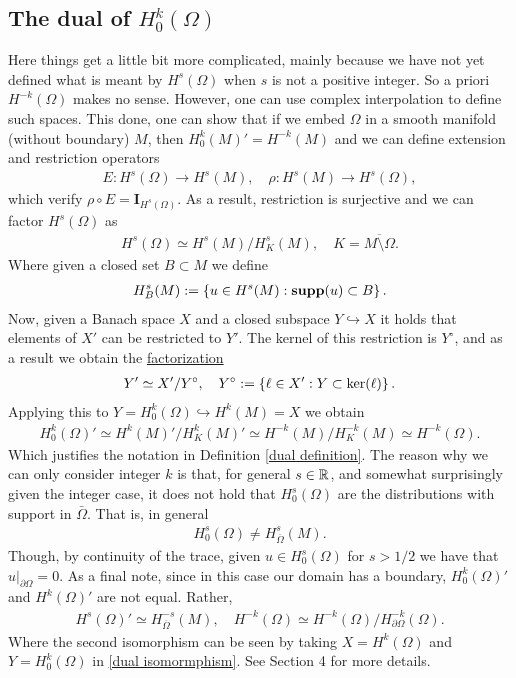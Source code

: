 \documentclass[12pt]{article}
\theoremstyle{definition}
\newcommand{\Id}{\mathbf{I}}\renewcommand{\ker}{\mathbf{ker}}\newcommand{\supp}[1]{\mathbf{supp}(#1)}\renewcommand{\tr}[1]{\mathrm{tr}\left(#1\right)}
\newcommand\restr[2]{\left.#1\right|_{#2}}
\begin{document}
\subsection{The dual of $H^k_0(\Omega)$}
Here things get a little bit more complicated, mainly because we have not yet defined what is meant by
$H^s(\Omega)$ when $s$ is not a positive integer. So a priori $H^{-k}(\Omega)$ makes no sense. However, one can use complex interpolation to define such spaces. This done, one can show that if we embed $\Omega$ in a smooth manifold (without boundary) $M$, then $H_0^k(M)'=H^{-k}(M)$ and we can define extension and restriction operators
\begin{align*}
  E:H^s(\Omega ) \to H^s(M), \quad \rho: H^s(M) \to H^s(\Omega ),
\end{align*}
which verify $\rho \circ E = \Id_{H^s(\Omega )}$. As a result, restriction is surjective and we can factor $H^s(\Omega )$ as
\begin{align}\label{ismorphism}
  H^s(\Omega )\simeq H^s(M)\slash H^s_K(M ), \quad K=\overline{M\setminus \Omega }.
\end{align}
Where given a closed set $B\subset M$ we define
\begin{align*}
  H^s_B(M):= \set{u \in H^s(M): \supp{u} \subset B}.
\end{align*}
Now, given a Banach space $X$ and a closed subspace $Y \hookrightarrow X$ it holds that elements of $X'$ can be restricted to $Y'$. The kernel of this restriction is $Y^\circ$, and as a result we obtain the \href{https://math.la.asu.edu/~quigg/teach/courses/578/2008/notes/adjoints.pdf}{factorization}
\begin{align}\label{dual isomormphism}
  Y' \simeq X'\slash Y^\circ, \quad Y^\circ:= \left\{\ell \in X': Y \subset \rm{ker}(\ell)\right\}.
\end{align}
Applying this to $Y= H^k_0(\Omega )\hookrightarrow H^k(M) =X$ we obtain
\begin{align*}
  H^{k}_0(\Omega )' \simeq H^{k}(M)'\slash H^{k}_K(M)'\simeq H^{-k}(M)\slash H^{-k}_K(M )\simeq H^{-k}(\Omega ).
\end{align*}
Which justifies the notation in Definition \ref{dual definition}. The reason why we can only consider
integer $k$ is that, for general $s \in \mathbb{R}$, and somewhat surprisingly given the integer case, it does not hold that $H^s_0(\Omega )$ are the distributions with support in $\bar{\Omega}$. That is, in general
\begin{align*}
  H^s_0(\Omega )\neq H^{s}_{\overline{\Omega } }(M).
\end{align*}
Though, by continuity of the trace, given  $ u \in H^s_0(\Omega )$ for $s>1/2$ we have that $\restr{u}{\partial \Omega } =0$.
As a final note, since in this case our domain has a boundary, $H_0^k(\Omega )'$ and $H^k(\Omega )'$ are not equal. Rather,
\begin{align*}
  H^s(\Omega )'\simeq H_{\overline{\Omega } }^{-s}(M), \quad H^{-k}(\Omega ) \simeq H^{-k}(\Omega )\slash H_{\partial \Omega }^{-k}(\Omega ).
\end{align*}
Where the second isomorphism can be seen by taking $X=H^k(\Omega )$ and $Y=H^k_{0 }(\Omega )$ in \eqref{dual isomormphism}. See \cite{taylor2013partial} Section 4 for more details.
\end{document}
